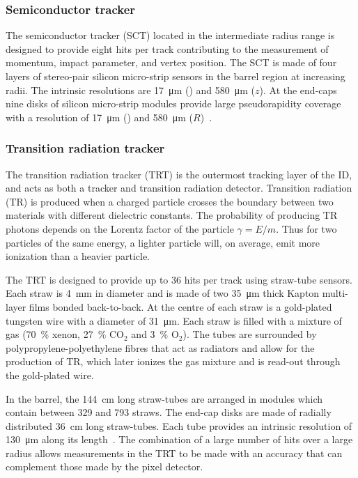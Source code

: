 \subsubsection{Semiconductor tracker}
The semiconductor tracker (SCT) located in the intermediate radius range is designed to provide eight hits per track contributing to the measurement of momentum, impact parameter, and vertex position. The SCT is made of four layers of stereo-pair silicon micro-strip sensors in the barrel region at increasing radii. The intrinsic resolutions are \SI{17}{\um} (\rphi) and \SI{580}{\um} ($z$). At the end-caps nine disks of silicon micro-strip modules provide large pseudorapidity coverage with a resolution of \SI{17}{\um} (\rphi) and \SI{580}{\um} ($R$)~\cite{Detector:ATLASExperimentGeneral}.

\subsubsection{Transition radiation tracker}
The transition radiation tracker (TRT) is the outermost tracking layer of the ID, and acts as both a tracker and transition radiation detector. Transition radiation (TR) is produced when a charged particle crosses the boundary between two materials with different dielectric constants. The probability of producing TR photons depends on the Lorentz factor of the particle $\gamma=E/m$. Thus for two particles of the same energy, a lighter particle will, on average, emit more ionization than a heavier particle.

The TRT is designed to provide up to \num{36} hits per track using straw-tube sensors. Each straw is \SI{4}{\mm} in diameter and is made of two \SI{35}{\micro\meter} thick Kapton multi-layer films bonded back-to-back. At the centre of each straw is a gold-plated tungsten wire with a diameter of \SI{31}{\micro\meter}. Each straw is filled with a mixture of gas (\SI{70}{\percent} xenon, \SI{27}{\percent} $\textrm{CO}_{2}$ and \SI{3}{\percent} $\textrm{O}_2$). The tubes are surrounded by polypropylene-polyethylene fibres that act as radiators and allow for the production of TR, which later ionizes the gas mixture and is read-out through the gold-plated wire.

In the barrel, the \SI{144}{\cm} long straw-tubes are arranged in modules which contain between \num{329} and \num{793} straws. The end-cap disks are made of radially distributed \SI{36}{\cm} long straw-tubes. Each tube provides an intrinsic resolution of \SI{130}{\um} along its length~\cite{Detector:ATLASExperimentGeneral}. The combination of a large number of hits over a large radius allows measurements in the TRT to be made with an accuracy that can complement those made by the pixel detector.

